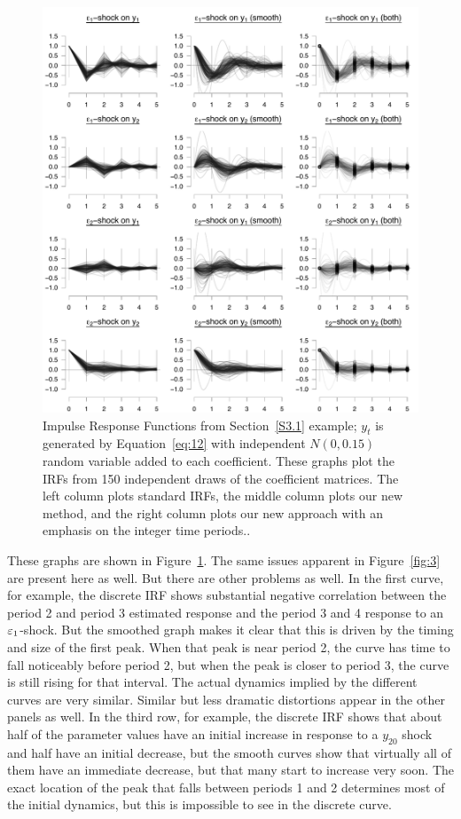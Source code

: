 \documentclass[12pt,fleqn]{article}
\begin{document}
\begin{figure}[t]
  \centering
  \includegraphics[width=6.5in]{graphs/numeric2.pdf}
  \caption{Impulse Response Functions from Section~\ref{S3.1} example;
    $y_t$ is generated by Equation~\eqref{eq:12} with independent
    $N(0,0.15)$ random variable added to each coefficient. These
    graphs plot the IRFs from 150 independent draws of the
    coefficient matrices. The left column plots standard IRFs, the
    middle column plots our new method, and the right column plots our
    new approach with an emphasis on the integer time periods..}
  \label{fig:4}
\end{figure}

These graphs are shown in Figure~\ref{fig:4}. The same issues apparent
in Figure~\ref{fig:3} are present here as well. But there are other
problems as well. In the first curve, for example, the discrete IRF
shows substantial negative correlation between the period 2 and period
3 estimated response and the period 3 and 4 response to an
$\varepsilon_1$-shock. But the smoothed graph makes it clear that this is
driven by the timing and size of the first peak. When that peak is
near period 2, the curve has time to fall noticeably before period 2,
but when the peak is closer to period 3, the curve is still rising for
that interval. The actual dynamics implied by the different curves are
very similar. Similar but less dramatic distortions appear in the
other panels as well. In the third row, for example, the discrete
IRF shows that about half of the parameter values have an initial
increase in response to a $y_{20}$ shock and half have an initial
decrease, but the smooth curves show that virtually all of them have
an immediate decrease, but that many start to increase very soon. The
exact location of the peak that falls between periods 1 and 2
determines most of the initial dynamics, but this is impossible to see
in the discrete curve.
\end{document}
